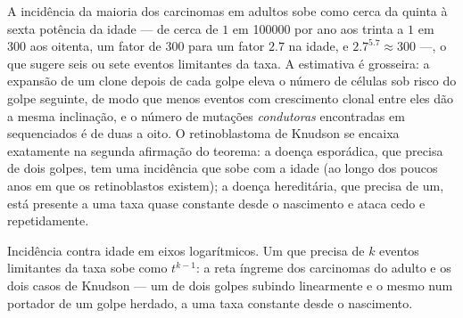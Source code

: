 \begin{example}\label{ex:b3:cancer-biology:exponent}
A incidência da maioria dos carcinomas em adultos sobe como cerca da
quinta à sexta potência da idade --- de cerca de $1$ em \num{100000}
por ano aos trinta a $1$ em $300$ aos oitenta, um fator de $300$ para
um fator $2.7$ na idade, e $2.7^{5.7} \approx 300$ ---, o que sugere
seis ou sete eventos limitantes da taxa. A estimativa é grosseira: a
expansão de um clone depois de cada golpe eleva o número de células sob
risco do golpe seguinte, de modo que menos eventos com crescimento
clonal entre eles dão a mesma inclinação, e o número de mutações
\emph{condutoras} encontradas em  sequenciados é de duas a oito.
O retinoblastoma de Knudson se encaixa exatamente na segunda afirmação
do teorema: a doença esporádica, que precisa de dois golpes, tem uma
incidência que sobe com a idade (ao longo dos poucos anos em que os
retinoblastos existem); a doença hereditária, que precisa de um, está
presente a uma taxa quase constante desde o nascimento e ataca cedo e
repetidamente.
\end{example}

\begin{omfigure}

{\small Incidência contra idade em eixos logarítmicos. Um  que
precisa de $k$ eventos limitantes da taxa sobe como $t^{k-1}$: a reta
íngreme dos carcinomas do adulto e os dois casos de Knudson --- um
 de dois golpes subindo linearmente e o mesmo  num portador
de um golpe herdado, a uma taxa constante desde o nascimento.}
\end{omfigure}

